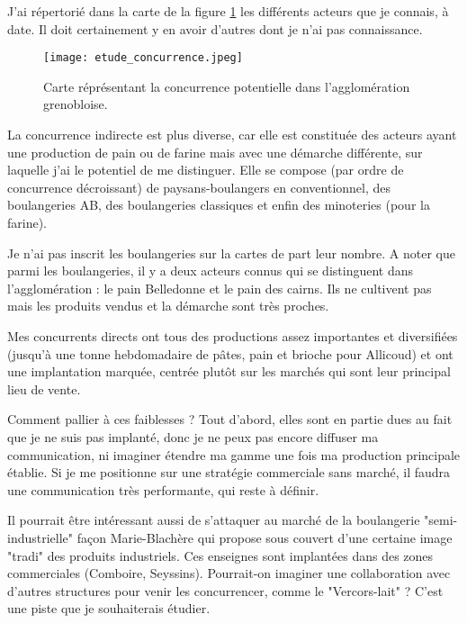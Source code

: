 \documentclass{book}
\begin{document}
J’ai répertorié dans la carte de la figure \ref{fig:concurrence} les différents acteurs que je connais, à date. Il doit certainement y en avoir d’autres dont je n’ai pas connaissance. 

\begin{figure}[h!]
\begin{center}
	\texttt{[image: etude\_concurrence.jpeg]}
	\caption{Carte réprésentant la concurrence potentielle dans l'agglomération grenobloise.}
	\label{fig:concurrence}
\end{center}
\end{figure}

La concurrence indirecte est plus diverse, car elle est constituée des acteurs ayant une production de pain ou de farine mais avec une démarche différente, sur laquelle j’ai le potentiel de me distinguer. Elle se compose (par ordre de concurrence décroissant) de paysans-boulangers en conventionnel, des boulangeries AB, des boulangeries classiques et enfin des minoteries (pour la farine). 

Je n’ai pas inscrit les boulangeries sur la cartes de part leur nombre. A noter que parmi les boulangeries, il y a deux acteurs connus qui se distinguent dans l’agglomération : le pain Belledonne et le pain des cairns. Ils ne cultivent pas mais les produits vendus et la démarche sont très proches.

Mes concurrents directs ont tous des productions assez importantes et diversifiées (jusqu’à une tonne hebdomadaire de pâtes, pain et brioche pour Allicoud) et ont une implantation marquée, centrée plutôt sur les marchés qui sont leur principal lieu de vente. 

Comment pallier à ces faiblesses ? Tout d’abord, elles sont en partie dues au fait que je ne suis pas implanté, donc je ne peux pas encore diffuser ma communication, ni imaginer étendre ma gamme une fois ma production principale établie. Si je me positionne sur une stratégie commerciale sans marché, il faudra une communication très performante, qui reste à définir. 

Il pourrait être intéressant aussi de s’attaquer au marché de la boulangerie "semi-industrielle" façon Marie-Blachère qui propose sous couvert d’une certaine image "tradi" des produits industriels. Ces enseignes sont implantées dans des zones commerciales (Comboire, Seyssins). Pourrait-on imaginer une collaboration avec d’autres structures pour venir les concurrencer, comme le "Vercors-lait" ? C’est une piste que je souhaiterais étudier. 
\end{document}
